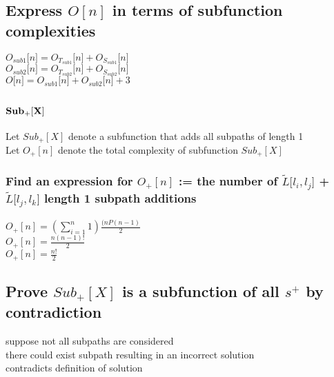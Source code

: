 \documentclass[11pt]{article}
\begin{document}
\subsection{Express $O[n]$ in terms of subfunction complexities}
\begin{center}
$
O_{sub1}\lbrack n \rbrack = O_{T_{sub1}}\lbrack n \rbrack + O_{S_{sub1}}\lbrack n \rbrack
$
\\ \vspace{2mm}
$
O_{sub2}\lbrack n \rbrack = O_{T_{sub2}}\lbrack n \rbrack + O_{S_{sub2}}\lbrack n \rbrack
$
\\ \vspace{2mm}
$
O\lbrack n \rbrack = O_{sub1}\lbrack n \rbrack + O_{sub2}\lbrack n \rbrack + 3
$
\end{center}







\subsection{$\bold{Sub_+[X]}$}
Let $Sub_+[X]$ denote a subfunction that adds all subpaths of length 1\\
Let $O_+[n]$ denote the total complexity of subfunction $Sub_+[X]$

\subsubsection{Find an expression for $O_+[n]$ := the number of $\tilde{L} \lbrack l_i,l_j \rbrack$ + $\tilde{L} \lbrack l_j,l_k \rbrack$  length 1 subpath additions}
\begin{center}
\vspace{2mm}
$
O_+[n] = (\sum_{i=1}^n 1)\frac{(n P (n-1)}{2}
$
\\ \vspace{2mm}
$
O_+[n] = \frac{n(n-1)!}{2}
$
\\ \vspace{2mm}
$
O_+[n] = \frac{n!}{2}
$
\end{center}






\subsection{Prove $Sub_+[X]$ is a subfunction of all $s^+$ by contradiction}
suppose not all subpaths are considered\\
there could exist subpath resulting in an incorrect solution\\
contradicts definition of solution\\
\end{document}
